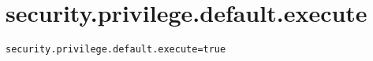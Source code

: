 \section{security.privilege.default.execute}
\label{configuration:SecurityPrivilegeDefaultExecute}
\AvailableInJavaOnly{\TODO}
\begin{lstlisting}[style=Props,caption={Usage example for \textit{security.privilege.default.execute}}]
security.privilege.default.execute=true
\end{lstlisting}